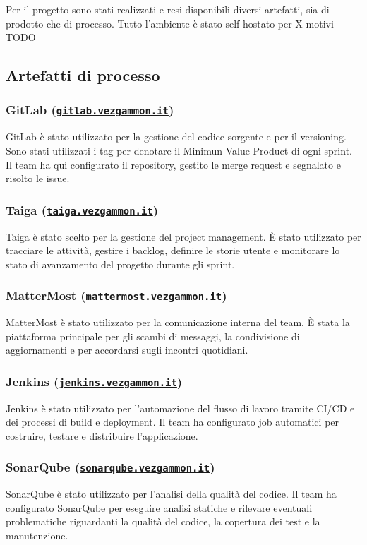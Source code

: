 \documentclass{article}
\begin{document}
Per il progetto sono stati realizzati e resi disponibili diversi artefatti, sia di prodotto che di processo. Tutto l'ambiente è stato self-hostato per X motivi TODO 

\subsection{Artefatti di processo}

\subsubsection{GitLab (\href{https://gitlab.vezgammon.it}{\texttt{gitlab.vezgammon.it}})}
GitLab è stato utilizzato per la gestione del codice sorgente e per il versioning. Sono stati utilizzati i tag per denotare il Minimun Value Product di ogni sprint.
Il team ha qui configurato il repository, gestito le merge request e segnalato e risolto le issue.  

\subsubsection{Taiga (\href{https://taiga.vezgammon.it}{\texttt{taiga.vezgammon.it}})}
Taiga è stato scelto per la gestione del project management. È stato utilizzato per tracciare le attività, gestire i backlog, definire le storie utente e 
monitorare lo stato di avanzamento del progetto durante gli sprint.

\subsubsection{MatterMost (\href{https://mattermost.vezgammon.it}{\texttt{mattermost.vezgammon.it}})}
MatterMost è stato utilizzato per la comunicazione interna del team. È stata la piattaforma principale per gli scambi di messaggi, la condivisione di aggiornamenti 
e per accordarsi sugli incontri quotidiani.

\subsubsection{Jenkins (\href{https://jenkins.vezgammon.it}{\texttt{jenkins.vezgammon.it}})}
Jenkins è stato utilizzato per l'automazione del flusso di lavoro tramite CI/CD e dei processi di build e deployment. Il team ha configurato job automatici per 
costruire, testare e distribuire l'applicazione.

\subsubsection{SonarQube (\href{https://sonarqube.vezgammon.it}{\texttt{sonarqube.vezgammon.it}})}
SonarQube è stato utilizzato per l'analisi della qualità del codice. Il team ha configurato SonarQube per eseguire analisi statiche e rilevare eventuali problematiche 
riguardanti la qualità del codice, la copertura dei test e la manutenzione.
\end{document}
